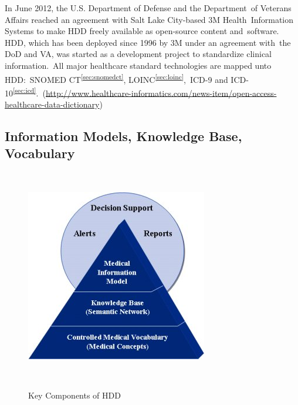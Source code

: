 \documentclass[DIV=calc, paper=a4, fontsize=12pt, onecolumn]{scrartcl}	 %
\begin{document}
  \noindent In June 2012, the U.S. Department of Defense and the Department\
  of Veterans Affairs reached an agreement with Salt Lake City-based 3M Health\
  Information Systems to make HDD freely available as open-source content and\
  software. HDD, which has been deployed since 1996 by 3M under an agreement with\
  the DoD and VA, was started as a development project to standardize clinical information.\
  All major healthcare standard technologies are mapped unto HDD:\
  SNOMED CT\textsuperscript{\ref{sec:snomedct}}, LOINC\textsuperscript{\ref{sec:loinc}},\
  ICD-9 and ICD-10\textsuperscript{\ref{sec:icd}}.\
  (\url{http://www.healthcare-informatics.com/news-item/open-access-healthcare-data-dictionary})

  \subsection{Information Models, Knowledge Base, Vocabulary}\

  \begin{figure}[ht!]
    \label{fig:ikv}
    \centering
    \includegraphics[scale=0.75]{hdd.jpg}
    \caption{Key Components of HDD}\
  \end{figure}  
\end{document}
